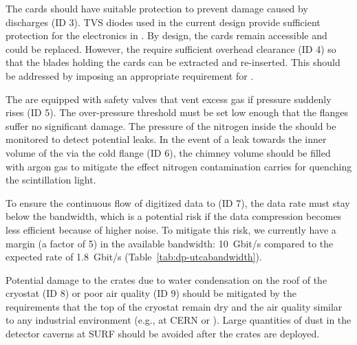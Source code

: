 The  cards should have suitable protection to prevent damage caused by  discharges (ID 3). TVS diodes used in the current design provide sufficient protection for the  electronics in . By design, the  cards remain accessible and could be replaced. However, the  require sufficient overhead clearance (ID 4) so that the blades holding the  cards can be extracted and re-inserted. This should be addressed by imposing an appropriate requirement for .

The  are equipped with safety valves that vent excess gas if pressure suddenly rises (ID 5). The over-pressure threshold must be set low enough that the flanges suffer no significant damage. The pressure of the nitrogen inside the  should be monitored to detect potential leaks. In the event of a leak towards the inner volume of the  via the cold flange (ID 6), the chimney volume should be filled with argon gas to mitigate the effect nitrogen contamination carries for quenching the scintillation light.  

To ensure the continuous flow of digitized data to  (ID 7), the data rate must stay below the  bandwidth, which is a potential risk if the data compression becomes less efficient because of higher noise. To mitigate this risk, we currently have a margin (a factor of \num{5}) in the available bandwidth: \SI{10}{Gbit/s}  compared to the expected rate of \SI{1.8}{Gbit/s} (Table~\ref{tab:dp-utcabandwidth}).

Potential damage to the  crates due to water condensation on the roof of the cryostat (ID 8) or poor air quality (ID 9) should be mitigated by the  requirements that the top of the cryostat remain dry and the air quality similar to any industrial environment (e.g., at CERN or ). Large quantities of dust in the detector caverns at SURF should be avoided after the  crates are deployed.

